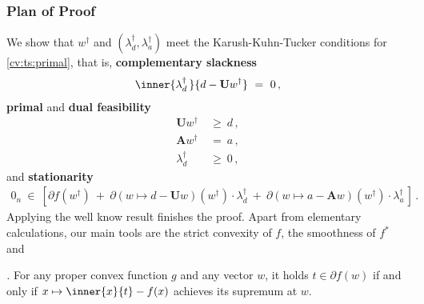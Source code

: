 \subsubsection*{Plan of Proof}
We show that 
$w^\dagger$ and 
$
(\lambda_d^\dagger,\lambda_a^\dagger)
$
meet the 
Karush-Kuhn-Tucker conditions for \ref{cv:ts:primal},
that is,
\textbf{complementary slackness}
\begin{gather}
  \label{cv:ts:comps}
\inner
{\lambda_d^\dagger\,}{d-\mathbf{U} w^\dagger}
\ 
=
\ 
0
\,,
\end{gather}
\textbf{primal} and \textbf{dual feasibility}
\begin{align}
  \label{primal_feas}
    \mathbf{U}w^\dagger
    &
    \ 
    \ge
    \ 
    d
    \,,
    \\
    \nonumber
    \mathbf{A}w^\dagger
    &
    \ 
    =
    \ 
    a
    \,,
  \\
  \label{dual_feas}
  \lambda_d^\dagger
    &
    \ 
  \ge
  \ 
  0
    \,,
\end{align}
and 
\textbf{stationarity}
\begin{gather}
  \mathrm{0}_n
  \ 
  \in
  \ 
  [
  \partial
  f(w^\dagger)
  \ 
  +
  \ 
    \partial
    \left( 
      w
      \mapsto
      d
      -
      \mathbf{U}w
    \right)
    (w^\dagger)
    \cdot
    \lambda_d^\dagger
    \ 
    +
    \ 
    \partial
    \left( 
      w
      \mapsto
      a
      -
      \mathbf{A}w
    \right)
    (w^\dagger)
    \cdot
    \lambda_a^\dagger
    \,
  ]
  \,.
\end{gather}
Applying the well know result\cite[Theorem~28.3]{Rockafellar1970}
finishes the proof.
Apart from elementary calculations, our main tools are the 
strict convexity of $f$, the smoothness of $f^*$ and 
\begin{proposition}
  \emph{
\cite[Theorem~23.5(a)-(b)]{Rockafellar1970}.
  }
  \label{cv:ts:prop}
   For any proper convex function $g$ and any vector $w$, 
   it holds $t\in \partial f(w)$ 
   if and only if 
   $
   x
   \mapsto
   \inner
   {x}{t}
   -
   f(x)
   $
   achieves its supremum at $w$.
\end{proposition}

